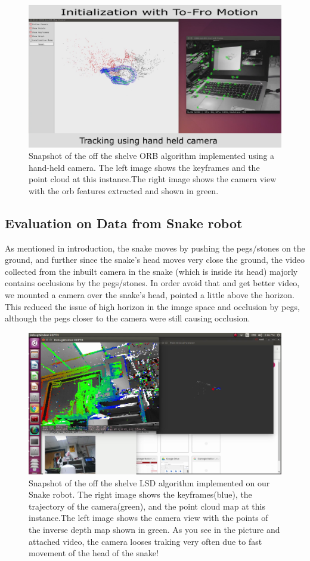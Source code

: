 \begin{figure}[H]
	\centering
	\includegraphics[width=1.0\linewidth]{figures/ORB_handHeld}
	\caption{Snapshot of the off the shelve ORB algorithm implemented using a hand-held camera. The left image shows the keyframes and the point cloud at this instance.The right image shows the camera view with the orb features extracted and shown in green. }
	\label{fig:orbhandheld}
\end{figure}

\subsection{Evaluation on Data from Snake robot}
As mentioned in introduction, the snake moves by pushing the pegs/stones on the ground, and further since the snake’s head moves very close the ground, the video collected from the inbuilt camera in the snake (which is inside its head) majorly contains occlusions by the pegs/stones. In order avoid that and get better video, we mounted a camera over the snake’s head, pointed a little above the horizon. This reduced the issue of high horizon in the image space and occlusion by pegs, although the pegs closer to the camera were still causing occlusion.

\begin{figure}[H]
	\centering
	\includegraphics[width=1.0\linewidth]{figures/SNAKE_LSD}
	\caption{Snapshot of the off the shelve LSD algorithm implemented on our Snake robot. The right image shows the keyframes(blue), the trajectory of the camera(green), and the point cloud map at this instance.The left image shows the camera view with the points of the inverse depth map shown in green. As you see in the picture and attached video, the camera looses traking very often due to fast movement of the head of the snake!}
	\label{fig:snakelsd}
\end{figure}
